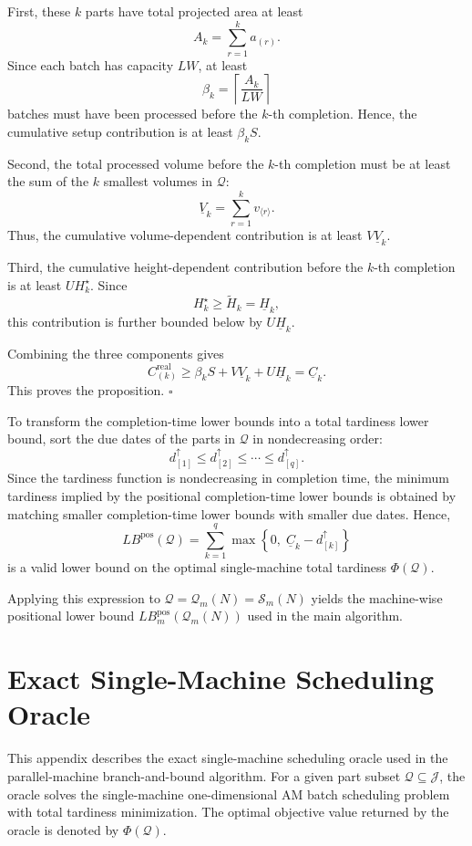 \documentclass[review,3p,times,authoryear]{elsarticle}
\newcounter{proposition}
\begin{document}
First, these $k$ parts have total projected area at least
\[
A_k=\sum_{r=1}^{k}a_{(r)}.
\]
Since each batch has capacity $LW$, at least
\[
\beta_k=\left\lceil\frac{A_k}{LW}\right\rceil
\]
batches must have been processed before the $k$-th completion. Hence, the
cumulative setup contribution is at least $\beta_k S$.

Second, the total processed volume before the $k$-th completion must be at
least the sum of the $k$ smallest volumes in $\mathcal{Q}$:
\[
\underline{V}_k=\sum_{r=1}^{k}v_{\langle r\rangle}.
\]
Thus, the cumulative volume-dependent contribution is at least
$V\underline{V}_k$.

Third, the cumulative height-dependent contribution before the $k$-th
completion is at least $UH_k^{\star}$. Since
\[
H_k^{\star}\ge \widetilde{H}_k=\underline{H}_k,
\]
this contribution is further bounded below by $U\underline{H}_k$.

Combining the three components gives
\[
C_{(k)}^{\mathrm{real}}
\ge
\beta_k S
+
V\underline{V}_k
+
U\underline{H}_k
=
\underline{C}_k.
\]
This proves the proposition.
\hfill $\square$

To transform the completion-time lower bounds into a total tardiness lower
bound, sort the due dates of the parts in $\mathcal{Q}$ in nondecreasing
order:
\[
d_{[1]}^{\uparrow}\le d_{[2]}^{\uparrow}\le \cdots \le d_{[q]}^{\uparrow}.
\]
Since the tardiness function is nondecreasing in completion time, the
minimum tardiness implied by the positional completion-time lower bounds is
obtained by matching smaller completion-time lower bounds with smaller due
dates. Hence,
\[
LB^{\mathrm{pos}}(\mathcal{Q})
=
\sum_{k=1}^{q}
\max
\left\{
0,\;
\underline{C}_k-d_{[k]}^{\uparrow}
\right\}
\]
is a valid lower bound on the optimal single-machine total tardiness
$\Phi(\mathcal{Q})$.

Applying this expression to
$\mathcal{Q}=\mathcal{Q}_m(N)=\mathcal{S}_m(N)$ yields the machine-wise
positional lower bound $LB_m^{\mathrm{pos}}(\mathcal{Q}_m(N))$ used in the
main algorithm.


\appendix
\section{Exact Single-Machine Scheduling Oracle}
\label{app:single_machine_oracle}

This appendix describes the exact single-machine scheduling oracle used in
the parallel-machine branch-and-bound algorithm. For a given part subset
$\mathcal{Q}\subseteq \mathcal{J}$, the oracle solves the single-machine
one-dimensional AM batch scheduling problem with total tardiness
minimization. The optimal objective value returned by the oracle is denoted
by $\Phi(\mathcal{Q})$.
\end{document}
